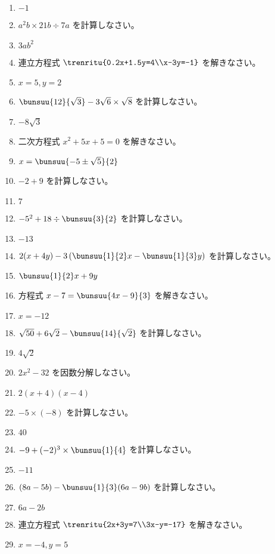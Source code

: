 \documentclass[uplatex,a4j,11pt]{jsreport}
\begin{document}
\begin{multicols}{2}
\begin{enumerate}
    \item $-1$
    \item $a^2b\times21b\div7a$ を計算しなさい。%
    \item $3ab^2$
    \item 連立方程式 $\trenritu{0.2x+1.5y=4\\x-3y=-1}$ を解きなさい。%
    \item $x=5, y=2$
    \item $\bunsuu{12}{\sqrt{3}}-3\sqrt{6}\times\sqrt{8}$ を計算しなさい。%
    \item $-8\sqrt{3}$
    \item 二次方程式 $x^2+5x+5=0$ を解きなさい。%
    \item $x = \bunsuu{-5\pm\sqrt{5}}{2}$
    \item $-2+9$ を計算しなさい。%
    \item $7$
    \item $-5^2+18\div\bunsuu{3}{2}$ を計算しなさい。%
    \item $-13$
    \item $2(x+4y)-3\left(\bunsuu{1}{2}x-\bunsuu{1}{3}y\right)$ を計算しなさい。%
    \item $\bunsuu{1}{2}x+9y$
    \item 方程式 $x-7=\bunsuu{4x-9}{3}$ を解きなさい。%
    \item $x=-12$
    \item $\sqrt{50}+6\sqrt{2}-\bunsuu{14}{\sqrt{2}}$ を計算しなさい。%
    \item $4\sqrt{2}$
    \item $2x^2-32$ を因数分解しなさい。%
    \item $2(x+4)(x-4)$
    \item $-5\times(-8)$ を計算しなさい。%
    \item $40$
    \item $-9+(-2)^3\times\bunsuu{1}{4}$ を計算しなさい。%
    \item $-11$
    \item $(8a-5b)-\bunsuu{1}{3}(6a-9b)$ を計算しなさい。%
    \item $6a-2b$
    \item 連立方程式 $\trenritu{2x+3y=7\\3x-y=-17}$ を解きなさい。%
    \item $x=-4, y=5$

\end{enumerate}
\end{multicols}
\end{document}
